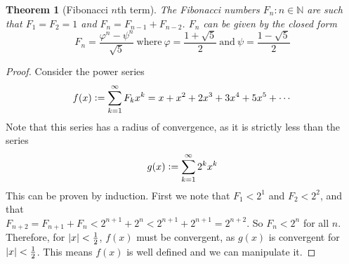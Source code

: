 \documentclass[fleqn,a4paper,11pt]{article}
\newcommand{\defeq}{\vcentcolon=}
\newcommand{\setstyle}{\mathbb}
\newcommand{\Naturals}{\setstyle N}
\newtheorem{theorem}{Theorem}[section]
\begin{document}
    \begin{theorem}[Fibonacci \(n\)th term]
    The Fibonacci numbers \(F_n: n \in \Naturals\) are such that
    \(F_1 = F_2 = 1\) and \(F_n = F_{n - 1} + F_{n - 2}\).  \(F_n\) can be given
    by the closed form
    \begin{equation*}
    F_n = \frac{\varphi^n - \psi^n}{\sqrt 5}
    \ \text{where}\ \varphi = \frac{1 + \sqrt 5} 2
    \ \text{and}\ \psi = \frac{1 - \sqrt 5} 2
    \end{equation*}
    \end{theorem}
    \begin{proof}
    Consider the power series
    \begin{equation*}
    f(x) \defeq \sum_{k=1}^\infty F_k x^k = x + x^2 + 2x^3 + 3x^4 + 5x^5
        + \dotsb
    \end{equation*}
    Note that this series has a radius of convergence, as it is strictly less
    than the series
    \begin{equation*}
    g(x) \defeq \sum_{k=1}^\infty 2^k x^k
    \end{equation*}
    This can be proven by induction. First we note that \(F_1 < 2^1\) and
    \(F_2 < 2^2\), and that \\
    \(F_{n + 2} = F_{n + 1} + F_n < 2^{n + 1} + 2^n < 2^{n + 1} + 2^{n + 1}
        = 2^{n + 2}\). So \(F_n < 2^n\) for all \(n\). Therefore, for
    \(\abs{x} < \frac 12\), \(f(x)\)  must be convergent, as \(g(x)\) is
    convergent for \(\abs{x} < \frac 12\). This means \(f(x)\) is well defined
    and we can manipulate it.


\end{proof}
\end{document}
